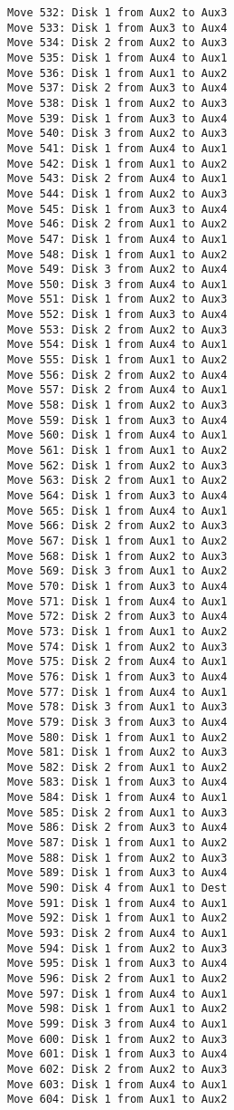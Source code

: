 \documentclass[11pt]{article}
\begin{document}
\begin{multicols}{2}
\begin{Verbatim}[fontsize=\small]
Move 532: Disk 1 from Aux2 to Aux3
Move 533: Disk 1 from Aux3 to Aux4
Move 534: Disk 2 from Aux2 to Aux3
Move 535: Disk 1 from Aux4 to Aux1
Move 536: Disk 1 from Aux1 to Aux2
Move 537: Disk 2 from Aux3 to Aux4
Move 538: Disk 1 from Aux2 to Aux3
Move 539: Disk 1 from Aux3 to Aux4
Move 540: Disk 3 from Aux2 to Aux3
Move 541: Disk 1 from Aux4 to Aux1
Move 542: Disk 1 from Aux1 to Aux2
Move 543: Disk 2 from Aux4 to Aux1
Move 544: Disk 1 from Aux2 to Aux3
Move 545: Disk 1 from Aux3 to Aux4
Move 546: Disk 2 from Aux1 to Aux2
Move 547: Disk 1 from Aux4 to Aux1
Move 548: Disk 1 from Aux1 to Aux2
Move 549: Disk 3 from Aux2 to Aux4
Move 550: Disk 3 from Aux4 to Aux1
Move 551: Disk 1 from Aux2 to Aux3
Move 552: Disk 1 from Aux3 to Aux4
Move 553: Disk 2 from Aux2 to Aux3
Move 554: Disk 1 from Aux4 to Aux1
Move 555: Disk 1 from Aux1 to Aux2
Move 556: Disk 2 from Aux2 to Aux4
Move 557: Disk 2 from Aux4 to Aux1
Move 558: Disk 1 from Aux2 to Aux3
Move 559: Disk 1 from Aux3 to Aux4
Move 560: Disk 1 from Aux4 to Aux1
Move 561: Disk 1 from Aux1 to Aux2
Move 562: Disk 1 from Aux2 to Aux3
Move 563: Disk 2 from Aux1 to Aux2
Move 564: Disk 1 from Aux3 to Aux4
Move 565: Disk 1 from Aux4 to Aux1
Move 566: Disk 2 from Aux2 to Aux3
Move 567: Disk 1 from Aux1 to Aux2
Move 568: Disk 1 from Aux2 to Aux3
Move 569: Disk 3 from Aux1 to Aux2
Move 570: Disk 1 from Aux3 to Aux4
Move 571: Disk 1 from Aux4 to Aux1
Move 572: Disk 2 from Aux3 to Aux4
Move 573: Disk 1 from Aux1 to Aux2
Move 574: Disk 1 from Aux2 to Aux3
Move 575: Disk 2 from Aux4 to Aux1
Move 576: Disk 1 from Aux3 to Aux4
Move 577: Disk 1 from Aux4 to Aux1
Move 578: Disk 3 from Aux1 to Aux3
Move 579: Disk 3 from Aux3 to Aux4
Move 580: Disk 1 from Aux1 to Aux2
Move 581: Disk 1 from Aux2 to Aux3
Move 582: Disk 2 from Aux1 to Aux2
Move 583: Disk 1 from Aux3 to Aux4
Move 584: Disk 1 from Aux4 to Aux1
Move 585: Disk 2 from Aux1 to Aux3
Move 586: Disk 2 from Aux3 to Aux4
Move 587: Disk 1 from Aux1 to Aux2
Move 588: Disk 1 from Aux2 to Aux3
Move 589: Disk 1 from Aux3 to Aux4
Move 590: Disk 4 from Aux1 to Dest
Move 591: Disk 1 from Aux4 to Aux1
Move 592: Disk 1 from Aux1 to Aux2
Move 593: Disk 2 from Aux4 to Aux1
Move 594: Disk 1 from Aux2 to Aux3
Move 595: Disk 1 from Aux3 to Aux4
Move 596: Disk 2 from Aux1 to Aux2
Move 597: Disk 1 from Aux4 to Aux1
Move 598: Disk 1 from Aux1 to Aux2
Move 599: Disk 3 from Aux4 to Aux1
Move 600: Disk 1 from Aux2 to Aux3
Move 601: Disk 1 from Aux3 to Aux4
Move 602: Disk 2 from Aux2 to Aux3
Move 603: Disk 1 from Aux4 to Aux1
Move 604: Disk 1 from Aux1 to Aux2

\end{Verbatim}
\end{multicols}
\end{document}
